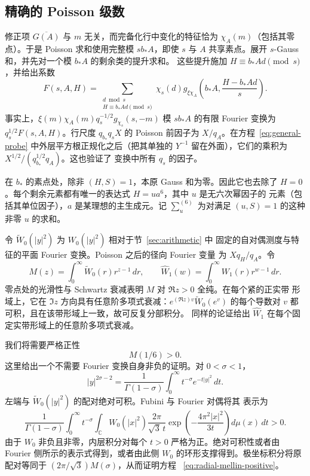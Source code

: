 \documentclass[11pt,a4paper]{article}
\numberwithin{equation}{section}
\numberwithin{figure}{section}
\theoremstyle{definition}
\theoremstyle{remark}
\begin{document}
\subsection{精确的 Poisson 级数}

修正项 $\overline{G(A)}$ 与 $m$ 无关，而完备化行中变化的特征恰为
$\chi_A(m)$（包括其零点）。于是 Poisson 求和使用完整模 $sb_*A$，即使 $s$ 与
$A$ 共享素点。展开 $s$-Gauss 和，并先对一个模 $b_*A$ 的剩余类的提升求和。
这些提升施加 $H\equiv b_*Ad\pmod s$，并给出系数
\begin{equation}\label{eq:local-F}
 F(s,A,H)=\sum_{\substack{d\bmod s\\H\equiv b_*Ad\pmod s}}
 \chi_s(d)g_{\xi\chi_A}\!\left(b_*A,\frac{H-b_*Ad}{s}\right).
\end{equation}
事实上，$\xi(m)\chi_A(m)q_s^{-1/2}g_{\chi_s}(s,-m)$ 模 $sb_*A$ 的有限 Fourier
变换为 $q_s^{1/2}F(s,A,H)$。行尺度 $q_{b_*}q_sX$ 的 Poisson 前因子为
$X/q_A$。在方程~\eqref{eq:general-probe} 中外层平方根正规化之后（把其单独的
$Y^{-1}$ 留在外面），它们的乘积为 $X^{1/2}/(q_{b_*}^{1/2}q_A)$。这也验证了
变换中所有 $q_s$ 的因子。

在 $b_*$ 的素点处，除非 $(H,S)=1$，本原 Gauss 和为零。因此它也去除了
$H=0$。每个剩余元素都有唯一的表达式 $H=ua^6$，其中 $u$ 是无六次幂因子的
元素（包括其单位因子），$a$ 是某理想的主生成元。记 $\sum_u^{(6)}$ 为对满足
$(u,S)=1$ 的这种非零 $u$ 的求和。

令 $\widetilde W_0(|y|^2)$ 为 $W_0(|y|^2)$ 相对于节~\ref{sec:arithmetic} 中
固定的自对偶测度与特征的平面 Fourier 变换。Poisson 之后的径向 Fourier 变量
为 $Xq_H/q_A$。令
\[
 M(z)=\int_0^\infty\widetilde W_0(r)r^{z-1}\,dr,
 \qquad
 \widehat W_1(w)=\int_0^\infty W_1(r)r^{w-1}\,dr.
\]
零点处的光滑性与 Schwartz 衰减表明 $M$ 对 $\Re z>0$ 全纯。在每个紧的正实带
形域上，它在 $\Im z$ 方向具有任意阶多项式衰减：$e^{(\Re z)v}\widetilde
W_0(e^v)$ 的每个导数对 $v$ 都可积，且在该带形域上一致，故可反复分部积分。
同样的论证给出 $\widehat W_1$ 在每个固定实带形域上的任意阶多项式衰减。

我们将需要严格正性
\begin{equation}\label{eq:radial-mellin-positive}
 M(1/6)>0.
\end{equation}
这里给出一个不需要 Fourier 变换自身非负的证明。对 $0<\sigma<1$，
\[
 |y|^{2\sigma-2}=\frac1{\Gamma(1-\sigma)}
             \int_0^\infty t^{-\sigma}e^{-t|y|^2}\,dt.
\]
左端与 $\widetilde W_0(|y|^2)$ 的配对绝对可积。Fubini 与 Fourier 对偶将其
表示为
\[
 \frac1{\Gamma(1-\sigma)}\int_0^\infty t^{-\sigma}
 \int_{\mathbb C}W_0(|x|^2)
       \frac{2\pi}{\sqrt3\,t}
       \exp\!\left(-\frac{4\pi^2|x|^2}{3t}\right)
                  d\mu(x)\,dt>0.
\]
由于 $W_0$ 非负且非零，内层积分对每个 $t>0$ 严格为正。绝对可积性或者由
Fourier 侧所示的表示式得到，或者由此侧 $W_0$ 的环形支撑得到。极坐标积分将原
配对等同于 $(2\pi/\sqrt3)M(\sigma)$，从而证明方程
~\eqref{eq:radial-mellin-positive}。
\end{document}
